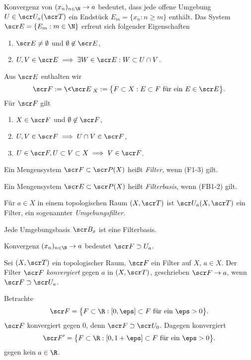 Konvergenz von $(x_n)_{n\in\N} \to a$ bedeutet, dass jede offene Umgebung $U \in \scr U_a(\scr T)$ ein Endstück $E_m = \{ x_n : n \ge m \}$ enthält.
Das System $\scr E = \{E_m : m \in \N\}$ erfreut sich folgender Eigenschaften
\begin{enumerate}[(FB1)]
	\item
		$\scr E \neq \emptyset$ und $\emptyset \not\in \scr E$,
	\item
		$U,V \in \scr E \implies \exists W \in \scr E: W \subset U \cap V$.
\end{enumerate}
Aus $\scr E$ enthalten wir
\[
	\scr F
	:= \<\scr E\>_X
	:= \big\{ F \subset X : E \subset F \text{ für ein $E \in \scr E$} \big\}.
\]
Für $\scr F$ gilt
\begin{enumerate}[(F1)]
	\item
		$X \in \scr F$ und $\emptyset \not\in \scr F$,
	\item
		$U, V \in \scr F \implies U \cap V \in \scr F$,
	\item
		$U \in \scr F, U \subset V \subset X \implies V \in \scr F$.
\end{enumerate}

\begin{df}
	Ein Mengensystem $\scr F \subset \scr P(X)$ heißt \emph{Filter}, wenn (F1-3) gilt.

	Ein Mengensystem $\scr E \subset \scr P(X)$ heißt \emph{Filterbasis}, wenn (FB1-2) gilt.
\end{df}

\begin{ex}
	Für $a \in X$ in einem topologischen Raum $(X, \scr T)$ ist $\scr U_a(X, \scr T)$ ein Filter, ein sogenannter \emph{Umgebungsfilter}.

	Jede Umgebungsbasis $\scr B_x$ ist eine Filterbasis.
\end{ex}

\begin{nt}
	Konvergenz $(x_n)_{n\in\N} \to a$ bedeutet $\scr F \supset U_a$.
\end{nt}

\begin{df}
	Sei $(X, \scr T)$ ein topologischer Raum, $\scr F$ ein Filter auf $X$, $a \in X$.
	Der Filter $\scr F$ \emph{konvergiert} gegen $a$ in $(X, \scr T)$, geschrieben $\scr F \to a$, wenn $\scr F \supset \scr U_a$.
\end{df}

\begin{ex}
	Betrachte
	\[
		\scr F = \big\{ F \subset \R : [0,\eps] \subset F \text{ für ein $\eps > 0$} \big\}.
	\]
	$\scr F$ konvergiert gegen $0$, denn $\scr F \supset \scr U_0$.
	Dagegen konvergiert
	\[
		\scr F' = \big\{ F \subset \R : [0,1+\eps] \subset F \text{ für ein $\eps > 0$} \big\}.
	\]
	gegen kein $a \in \R$.
\end{ex}

